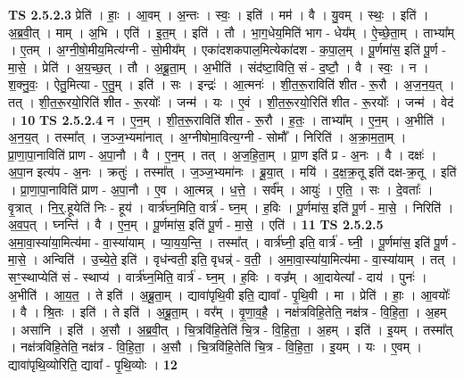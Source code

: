 \documentclass[17pt]{extarticle}
\begin{document}
                  \newline
                                \textbf{ TS 2.5.2.3} \newline
                  प्रेति॑ । हाः॒ । आ॒वम् । अ॒न्तः । स्वः॒ । इति॑ । मम॑ । वै । यु॒वम् । स्थः॒ । इति॑ । अ॒ब्र॒वी॒त् । माम् । अ॒भि । एति॑ । इ॒त॒म् । इति॑ । तौ । भा॒ग॒धेय॒मिति॑ भाग - धेय᳚म् । ऐ॒च्छे॒ता॒म् । ताभ्या᳚म् । ए॒तम् । अ॒ग्नी॒षो॒मीय॒मित्य॑ग्नी - सो॒मीय᳚म् । एका॑दशकपाल॒मित्येका॑दश - क॒पा॒ल॒म् । पू॒र्णमा॑स॒ इति॑ पू॒र्ण - मा॒से॒ । प्रेति॑ । अ॒य॒च्छ॒त् । तौ । अ॒ब्रू॒ता॒म् । अ॒भीति॑ । संद॑ष्टा॒विति॒ सं - द॒ष्टौ॒ । वै । स्वः॒ । न । श॒क्नु॒वः॒ । ऐतु॒मित्या - ए॒तु॒म् । इति॑ । सः । इन्द्रः॑ । आ॒त्मनः॑ । शी॒त॒रू॒राविति॑ शीत - रू॒रौ । अ॒ज॒न॒य॒त् । तत् । शी॒त॒रू॒रयो॒रिति॑ शीत - रू॒रयोः᳚ । जन्म॑ । यः । ए॒वं । शी॒त॒रू॒रयो॒रिति॑ शीत - रू॒रयोः᳚ । जन्म॑ । वेद॑ । \textbf{  10} \newline
                  \newline
                                \textbf{ TS 2.5.2.4} \newline
                  न । ए॒न॒म् । शी॒त॒रू॒राविति॑ शीत - रू॒रौ । ह॒तः॒ । ताभ्या᳚म् । ए॒न॒म् । अ॒भीति॑ । अ॒न॒य॒त् । तस्मा᳚त् । ज॒ञ्ज॒भ्यमा॑नात् । अ॒ग्नीषोमा॒वित्य॒ग्नी - सोमौ᳚ । निरिति॑ । अ॒क्रा॒म॒ता॒म् । प्रा॒णा॒पा॒नाविति॑ प्राण - अ॒पा॒नौ । वै । ए॒न॒म् । तत् । अ॒ज॒हि॒ता॒म् । प्रा॒ण इति॑ प्र - अ॒नः । वै । दक्षः॑ । अ॒पा॒न इत्य॑प - अ॒नः । क्रतुः॑ । तस्मा᳚त् । ज॒ञ्ज॒भ्यमा॑नः । ब्रू॒या॒त् । मयि॑ । द॒क्ष॒क्र॒तू इति॑ दक्ष-क्र॒तू । इति॑ । प्रा॒णा॒पा॒नाविति॑ प्राण - अ॒पा॒नौ । ए॒व । आ॒त्मन्न् । ध॒त्ते॒ । सर्व᳚म् । आयुः॑ । ए॒ति॒ । सः । दे॒वताः᳚ । वृ॒त्रात् । नि॒र्॒.हूयेति॑ निः - हूय॑ । वार्त्र॑घ्न॒मिति॒ वार्त्र॑ - घ्न॒म् । ह॒विः । पू॒र्णमा॑स॒ इति॑ पू॒र्ण - मा॒से॒ । निरिति॑ । अ॒व॒प॒त् । घ्नन्ति॑ । वै । ए॒न॒म् । पू॒र्णमा॑स॒ इति॑ पू॒र्ण - मा॒से॒ । एति॑ । \textbf{  11} \newline
                  \newline
                                \textbf{ TS 2.5.2.5} \newline
                  अ॒मा॒वा॒स्या॑या॒मित्य॑मा - वा॒स्या॑याम् । प्या॒य॒य॒न्ति॒ । तस्मा᳚त् । वार्त्र॑घ्नी॒ इति॒ वार्त्र॑ - घ्नी॒ । पू॒र्णमा॑स॒ इति॑ पू॒र्ण - मा॒से॒ । अन्विति॑ । उ॒च्ये॒ते॒ इति॑ । वृध॑न्वती॒ इति॒ वृधन्न्॑ - व॒ती॒ । अ॒मा॒वा॒स्या॑या॒मित्य॑मा - वा॒स्या॑याम् । तत् । सꣳ॒॒स्थाप्येति॑ सं - स्थाप्य॑ । वार्त्र॑घ्न॒मिति॒ वार्त्र॑ - घ्न॒म् । ह॒विः । वज्र᳚म् । आ॒दायेत्या᳚ - दाय॑ । पुनः॑ । अ॒भीति॑ । आ॒य॒त॒ । ते इति॑ । अ॒ब्रू॒ता॒म् । द्यावा॑पृथि॒वी इति॒ द्यावा᳚ - पृ॒थि॒वी । मा । प्रेति॑ । हाः॒ । आ॒वयोः᳚ । वै । श्रि॒तः । इति॑ । ते इति॑ । अ॒ब्रू॒ता॒म् । वर᳚म् । वृ॒णा॒व॒है॒ । नक्ष॑त्रविहि॒तेति॒ नक्ष॑त्र - वि॒हि॒ता॒ । अ॒हम् । असा॑नि । इति॑ । अ॒सौ । अ॒ब्र॒वी॒त् । चि॒त्रवि॑हि॒तेति॑ चि॒त्र - वि॒हि॒ता॒ । अ॒हम् । इति॑ । इ॒यम् । तस्मा᳚त् । नक्ष॑त्रविहि॒तेति॒ नक्ष॑त्र - वि॒हि॒ता॒ । अ॒सौ । चि॒त्रवि॑हि॒तेति॑ चि॒त्र - वि॒हि॒ता॒ । इ॒यम् । यः । ए॒वम् । द्यावा॑पृथि॒व्योरिति॒ द्यावा᳚ - पृ॒थि॒व्योः । \textbf{  12} \newline
\end{document}

